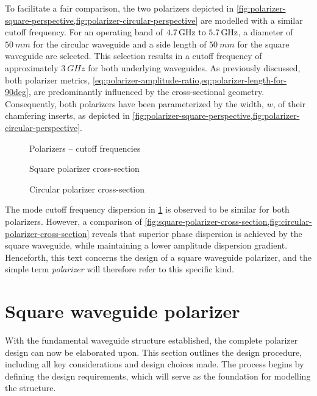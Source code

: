 \documentclass[11pt,a4paper,twoside,openany]{report}
\begin{document}
To facilitate a fair comparison, the two polarizers depicted in \cref{fig:polarizer-square-perspective,fig:polarizer-circular-perspective} are modelled with a similar cutoff frequency. For an operating band of $\frequencyrange$, a diameter of $\qty{50}{mm}$ for the circular waveguide and a side length of $\qty{50}{mm}$ for the square waveguide are selected. This selection results in a cutoff frequency of approximately $\qty{3}{GHz}$ for both underlying waveguides. As previously discussed, both polarizer metrics, \cref{eq:polarizer-amplitude-ratio,eq:polarizer-length-for-90deg}, are predominantly influenced by the cross-sectional geometry. Consequently, both polarizers have been parameterized by the width, $w$, of their chamfering inserts, as depicted in \cref{fig:polarizer-square-perspective,fig:polarizer-circular-perspective}.

\begin{figure}[!ht]
    \centering
    
    \caption{\label{fig:polarizers-cutoff-frequencies}Polarizers -- cutoff frequencies}
\end{figure}

\begin{figure}[!ht]
    \centering
    
    \caption{\label{fig:square-polarizer-cross-section}Square polarizer cross-section}
\end{figure}

\begin{figure}[!ht]
    \centering
    
    \caption{\label{fig:circular-polarizer-cross-section}Circular polarizer cross-section}
\end{figure}

The mode cutoff frequency dispersion in \cref{fig:polarizers-cutoff-frequencies} is observed to be similar for both polarizers. However, a comparison of \cref{fig:square-polarizer-cross-section,fig:circular-polarizer-cross-section} reveals that superior phase dispersion is achieved by the square waveguide, while maintaining a lower amplitude dispersion gradient. Henceforth, this text concerns the design of a square waveguide polarizer, and the simple term \emph{polarizer} will therefore refer to this specific kind.

\section{Square waveguide polarizer}
With the fundamental waveguide structure established, the complete polarizer design can now be elaborated upon. This section outlines the design procedure, including all key considerations and design choices made. The process begins by defining the design requirements, which will serve as the foundation for modelling the structure.
\end{document}

